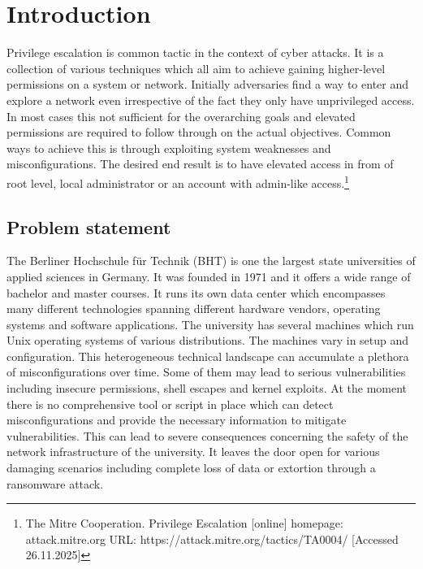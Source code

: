 \section{Introduction}

Privilege escalation is common tactic in the context of cyber attacks. It is a collection of various techniques which all aim to achieve gaining higher-level permissions on a system or network. Initially adversaries find a way to enter and explore a network even irrespective of the fact they only have unprivileged access. In most cases this not sufficient for the overarching goals and elevated permissions are required to follow through on the actual objectives. \newline\newline Common ways to achieve this is through exploiting system weaknesses and misconfigurations. The desired end result is to have elevated access in from of root level, local administrator or an account with admin-like access.\footnote{The Mitre Cooperation. Privilege Escalation [online] homepage: attack.mitre.org URL: https://attack.mitre.org/tactics/TA0004/ [Accessed 26.11.2025]}

\subsection{Problem statement}

The Berliner Hochschule für Technik (BHT) is one the largest state universities of applied sciences in Germany.  It was founded in 1971 and it offers a wide range of bachelor and master courses. It runs its own data center which encompasses  many different technologies spanning different hardware vendors, operating systems and software applications. The university has several machines which run Unix operating systems of various distributions. The machines vary in setup and configuration. This heterogeneous technical landscape can accumulate a plethora of misconfigurations over time. Some of them may lead to serious vulnerabilities including insecure permissions, shell escapes and kernel exploits. \newline At the moment there is no comprehensive tool or script in place which can detect misconfigurations and provide the necessary information to mitigate vulnerabilities.  \newline\newline This can lead to severe consequences concerning the safety of the network infrastructure of the university. It leaves the door open for various damaging scenarios including complete loss of data or extortion through a ransomware attack. 

